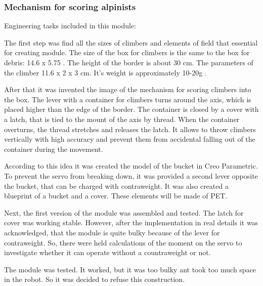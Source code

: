 \subsubsection{Mechanism for scoring alpinists}
  
  Engineering tasks included in this module:
  \begin{enumerate*}
    \item The first step was find all the sizes of climbers and elements of field that essential for creating module. The size of the box for climbers is the same to the box for debris: 14.6 x 5.75 . The height of the border is about 30 cm. The parameters of the climber 11.6 x 2 x 3 cm. It's weight is approximately 10-20g .
    
    \item After that it was invented the image of the mechanism for scoring climbers into the box. The lever with a container for climbers turns around the axis, which is placed higher than the edge of the border. The container is closed by a cover with a latch, that is tied to the mount of the axis by thread. When the container overturns, the thread stretches and releases the latch. It allows to throw climbers vertically with high accuracy and prevent them from accidental falling out of the container during the movement.
    
    \item According to this idea it was created the model of the bucket in Creo Parametric. To prevent the servo from breaking down, it was provided a second lever opposite the bucket, that can be charged with contraweight. It was also created a blueprint of a bucket and a cover. These elements will be made of PET.
    
    \item Next, the first version of the module was assembled and tested. The latch for cover was working stable. However, after the implementation in real details it was acknowledged, that the module is quite bulky because of the lever for contraweight. So, there were held calculations of the moment on the servo to investigate whether it can operate without a countraweight or not.
    
    \item The module was tested. It worked, but it was too bulky ant took too much space in the robot. So it was decided to refuse this construction.
    

\end{enumerate*}
